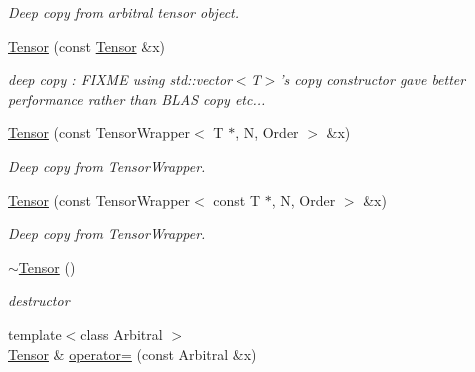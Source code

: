 \begin{DoxyCompactItemize}
\begin{DoxyCompactList}\small\item\em Deep copy from arbitral tensor object. \item\end{DoxyCompactList}\item 
\hypertarget{classbtas_1_1_tensor_ac8fb6af11f3cf5af78a459f491ea6b33}{
\hyperlink{classbtas_1_1_tensor_ac8fb6af11f3cf5af78a459f491ea6b33}{Tensor} (const \hyperlink{classbtas_1_1_tensor}{Tensor} \&x)}
\label{classbtas_1_1_tensor_ac8fb6af11f3cf5af78a459f491ea6b33}

\begin{DoxyCompactList}\small\item\em deep copy : FIXME using std::vector$<$T$>$'s copy constructor gave better performance rather than BLAS copy etc... \item\end{DoxyCompactList}\item 
\hypertarget{classbtas_1_1_tensor_a686571f7ac77e20e9afc08156ef32e3f}{
\hyperlink{classbtas_1_1_tensor_a686571f7ac77e20e9afc08156ef32e3f}{Tensor} (const TensorWrapper$<$ T $\ast$, N, Order $>$ \&x)}
\label{classbtas_1_1_tensor_a686571f7ac77e20e9afc08156ef32e3f}

\begin{DoxyCompactList}\small\item\em Deep copy from TensorWrapper. \item\end{DoxyCompactList}\item 
\hypertarget{classbtas_1_1_tensor_aac9bc483223f21fb9f4887b6c2c9e884}{
\hyperlink{classbtas_1_1_tensor_aac9bc483223f21fb9f4887b6c2c9e884}{Tensor} (const TensorWrapper$<$ const T $\ast$, N, Order $>$ \&x)}
\label{classbtas_1_1_tensor_aac9bc483223f21fb9f4887b6c2c9e884}

\begin{DoxyCompactList}\small\item\em Deep copy from TensorWrapper. \item\end{DoxyCompactList}\item 
\hypertarget{classbtas_1_1_tensor_a7d1834c70ab9f6c66f1e466cbccc6dc5}{
\hyperlink{classbtas_1_1_tensor_a7d1834c70ab9f6c66f1e466cbccc6dc5}{$\sim$Tensor} ()}
\label{classbtas_1_1_tensor_a7d1834c70ab9f6c66f1e466cbccc6dc5}

\begin{DoxyCompactList}\small\item\em destructor \item\end{DoxyCompactList}\item 
\hypertarget{classbtas_1_1_tensor_a2ae10439307e95a9ed67700d1d9a9ab0}{
{\footnotesize template$<$class Arbitral $>$ }\\\hyperlink{classbtas_1_1_tensor}{Tensor} \& \hyperlink{classbtas_1_1_tensor_a2ae10439307e95a9ed67700d1d9a9ab0}{operator=} (const Arbitral \&x)}
\label{classbtas_1_1_tensor_a2ae10439307e95a9ed67700d1d9a9ab0}


\end{DoxyCompactItemize}

